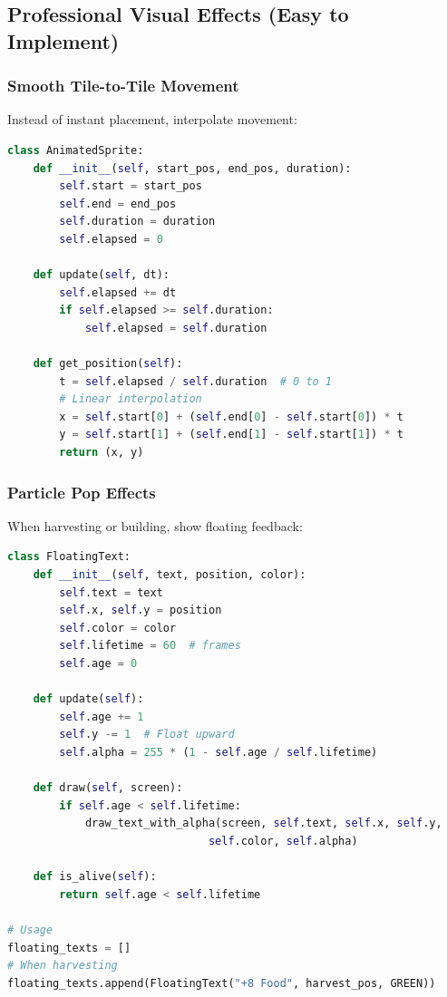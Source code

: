 \documentclass[12pt,a4paper]{article}
\begin{document}
\subsection{Professional Visual Effects (Easy to Implement)}

\subsubsection{Smooth Tile-to-Tile Movement}

Instead of instant placement, interpolate movement:

\begin{lstlisting}[language=Python]
class AnimatedSprite:
    def __init__(self, start_pos, end_pos, duration):
        self.start = start_pos
        self.end = end_pos
        self.duration = duration
        self.elapsed = 0
    
    def update(self, dt):
        self.elapsed += dt
        if self.elapsed >= self.duration:
            self.elapsed = self.duration
    
    def get_position(self):
        t = self.elapsed / self.duration  # 0 to 1
        # Linear interpolation
        x = self.start[0] + (self.end[0] - self.start[0]) * t
        y = self.start[1] + (self.end[1] - self.start[1]) * t
        return (x, y)
\end{lstlisting}

\subsubsection{Particle Pop Effects}

When harvesting or building, show floating feedback:

\begin{lstlisting}[language=Python]
class FloatingText:
    def __init__(self, text, position, color):
        self.text = text
        self.x, self.y = position
        self.color = color
        self.lifetime = 60  # frames
        self.age = 0
    
    def update(self):
        self.age += 1
        self.y -= 1  # Float upward
        self.alpha = 255 * (1 - self.age / self.lifetime)
    
    def draw(self, screen):
        if self.age < self.lifetime:
            draw_text_with_alpha(screen, self.text, self.x, self.y, 
                               self.color, self.alpha)
    
    def is_alive(self):
        return self.age < self.lifetime

# Usage
floating_texts = []
# When harvesting
floating_texts.append(FloatingText("+8 Food", harvest_pos, GREEN))
\end{lstlisting}
\end{document}
